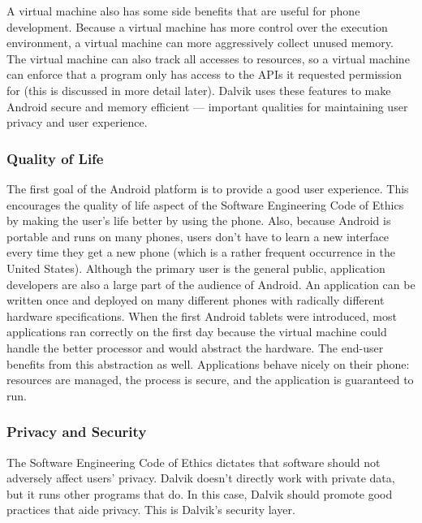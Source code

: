 \documentclass[11pt]{article}
\begin{document}
\begin{multicols}{2}
A virtual machine also has some side benefits that are useful for phone
development.  Because a virtual machine has more control over the execution
environment, a virtual machine can more aggressively collect unused memory.  The
virtual machine can also track all accesses to resources, so a virtual machine
can enforce that a program only has access to the APIs it requested permission
for (this is discussed in more detail later).  Dalvik uses these features to
make Android secure and memory efficient --- important qualities for maintaining
user privacy and user experience.


\subsubsection{Quality of Life} %
\label{ssub:quality}

The first goal of the Android platform is to provide a good user experience.
This encourages the quality of life aspect of the Software Engineering Code of
Ethics by making the user's life better by using the phone.  Also, because
Android is portable and runs on many phones, users don't have to learn a new
interface every time they get a new phone (which is a rather frequent occurrence
in the United States).  Although the primary user is the general public,
application developers are also a large part of the audience of Android.  An
application can be written once and deployed on many different phones with
radically different hardware specifications.  When the first Android tablets
were introduced, most applications ran correctly on the first day because the
virtual machine could handle the better processor and would abstract the
hardware.  The end-user benefits from this abstraction as well.  Applications
behave nicely on their phone: resources are managed, the process is secure, and
the application is guaranteed to run.


\subsubsection{Privacy and Security} %
\label{ssub:privacy}

The Software Engineering Code of Ethics dictates that software should not
adversely affect users' privacy.  Dalvik doesn't directly work with private
data, but it runs other programs that do.  In this case, Dalvik should promote
good practices that aide privacy.  This is Dalvik's security layer.


\end{multicols}
\end{document}
